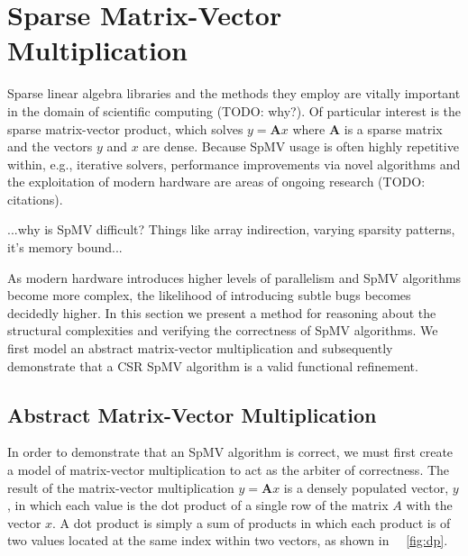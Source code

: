 \section{Sparse Matrix-Vector Multiplication}

Sparse linear algebra libraries and the methods they employ are vitally important in the domain of scientific computing (TODO: why?).  Of particular interest is the sparse matrix-vector product, which solves $y = \bm{A}x$ where $\bm{A}$ is a sparse matrix and the vectors $y$ and $x$ are dense.  Because SpMV usage is often highly repetitive within, e.g., iterative solvers, performance improvements via novel algorithms and the exploitation of modern hardware are areas of ongoing research (TODO: citations).

...why is SpMV difficult? Things like array indirection, varying sparsity patterns, it's memory bound...

As modern hardware introduces higher levels of parallelism and SpMV algorithms become more complex, the likelihood of introducing subtle bugs becomes decidedly higher.  In this section we present a method for reasoning about the structural complexities and verifying the correctness of SpMV algorithms.  We first model an abstract matrix-vector multiplication and subsequently demonstrate that a CSR SpMV algorithm is a valid functional refinement.

\subsection{Abstract Matrix-Vector Multiplication}
\label{sec:mvmabs}

In order to demonstrate that an SpMV algorithm is correct, we must first create a model of matrix-vector multiplication to act as the arbiter of correctness.  The result of the matrix-vector multiplication $y = \bm{A}x$ is a densely populated vector, $y$, in which each value is the dot product of a single row of the matrix $A$ with the vector $x$.  A dot product is simply a sum of products in which each product is of two values located at the same index within two vectors, as shown in ~\figurename~\ref{fig:dp}.

